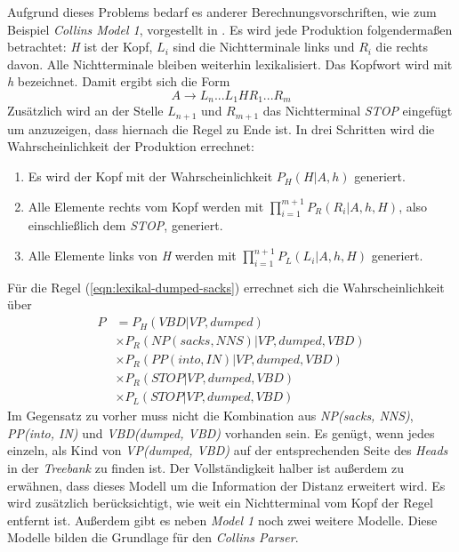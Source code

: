Aufgrund dieses Problems bedarf es anderer Berechnungsvorschriften, wie zum Beispiel \textit{Collins Model 1}, vorgestellt in \cite{collinsModel}. 
Es wird jede Produktion folgendermaßen betrachtet: \textit{H} ist der Kopf, \( L_i \) sind die Nichtterminale links und \( R_i \) die rechts davon. Alle Nichtterminale bleiben weiterhin lexikalisiert. Das Kopfwort wird mit \textit{h} bezeichnet. Damit ergibt sich die Form
\[ A \to L_n...L_1 H R_1...R_m \]
Zusätzlich wird an der Stelle \( L_{n+1} \) und \( R_{m+1} \) das Nichtterminal \textit{STOP} eingefügt um anzuzeigen, dass hiernach die Regel zu Ende ist. In drei Schritten wird die Wahrscheinlichkeit der Produktion errechnet:
\begin{enumerate}
\item Es wird der Kopf mit der Wahrscheinlichkeit \( P_H(H | A, h) \) generiert.
\item Alle Elemente rechts vom Kopf werden mit \( \displaystyle\prod_{i = 1}^{m+1} P_R(R_i | A, h, H) \), also einschließlich dem \textit{STOP}, generiert.
\item Alle Elemente links von \textit{H} werden mit \( \displaystyle\prod_{i = 1}^{n+1} P_L(L_i | A, h, H) \) generiert.
\end{enumerate}
Für die Regel (\ref{eqn:lexikal-dumped-sacks}) errechnet sich die Wahrscheinlichkeit über
\begin{align}
P & = P_H(VBD|VP, dumped) \nonumber \\ & \times P_R(NP(sacks, NNS)|VP, dumped, VBD) \nonumber \\ & \times P_R(PP(into, IN)|VP, dumped, VBD) \nonumber \\ & \times P_R(STOP|VP, dumped, VBD) \nonumber \\ & \times P_L(STOP|VP, dumped, VBD)
\end{align}
Im Gegensatz zu vorher muss nicht die Kombination aus \textit{NP(sacks, NNS)}, \textit{PP(into, IN)} und \textit{VBD(dumped, VBD)} vorhanden sein. Es genügt, wenn jedes einzeln, als Kind von \textit{VP(dumped, VBD)} auf der entsprechenden Seite des \textit{Heads} in der \textit{Treebank} zu finden ist. 
Der Vollständigkeit halber ist außerdem zu erwähnen, dass dieses Modell um die Information der Distanz erweitert wird. Es wird zusätzlich berücksichtigt, wie weit ein Nichtterminal vom Kopf der Regel entfernt ist. 
Außerdem gibt es neben \textit{Model 1} noch zwei weitere Modelle. Diese Modelle bilden die Grundlage für den \textit{Collins Parser}. \cite{collinsModel}